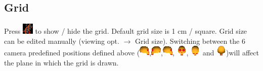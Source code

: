 \subsection{Grid}
Press \includegraphics[scale=0.7]{images/pixmap/grid3.png} to show / hide the grid. Default grid size is 1 cm / square. Grid size can be edited manually
(viewing opt. $\rightarrow$ Grid size).
Switching between the 6 camera predefined positions defined above (\includegraphics[scale=0.7]{images/pixmap/right2.png},\includegraphics[scale=0.7]{images/pixmap/left2.png},\includegraphics[scale=0.7]{images/pixmap/right2.png}, \includegraphics[scale=0.7]{images/pixmap/front2.png}, \includegraphics[scale=0.7]{images/pixmap/above2.png} and \includegraphics[scale=0.7]{images/pixmap/back2.png})will
affect the plane in which the grid is drawn.


